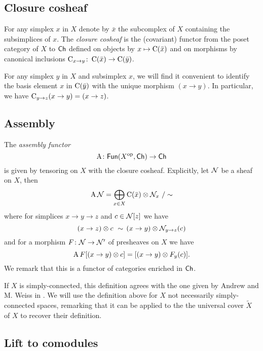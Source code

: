 \subsection{Closure cosheaf}

For any simplex $x$ in $X$ denote by $\bar x$ the subcomplex of $X$ containing the subsimplices of $x$.
The \textit{closure cosheaf} is the (covariant) functor from the poset category of $X$ to $\mathsf{Ch}$ defined on objects by $x \mapsto \operatorname{C}(\bar x)$ and on morphisms by canonical inclusions $\operatorname{C}_{x \to y} \colon \operatorname{C}(\bar x) \to \operatorname{C}(\bar y)$.

For any simplex $y$ in $X$ and subsimplex $x$, we will find it convenient to identify the basis element $x$ in $\operatorname{C}(\bar y)$ with the unique morphism $(x \to y)$.
In particular, we have $\operatorname{C}_{y \to z} (x \to y) = (x \to z)$.

\subsection{Assembly}\label{ss:assembly}

The \textit{assembly functor}
\[
\operatorname{A} \colon \mathsf{Fun}(X^{\mathrm{op}}, \mathsf{Ch}) \to \mathsf{Ch}
\]
is given by tensoring on $X$ with the closure cosheaf.
Explicitly, let $\mathcal{N}$ be a sheaf on $X$, then
\[
\operatorname{A} \mathcal{N} = \bigoplus_{x \in X} \operatorname{C}(\bar x) \otimes \mathcal{N}_x \ / \sim
\]
where for simplices $x \to y \to z$ and $c \in \mathcal{N}[z]$ we have
\[
(x \to z) \otimes c \ \sim \, (x \to y) \otimes \mathcal{N}_{y \to z}(c)
\]
and for a morphism $F \colon \mathcal{N} \to \mathcal{N}'$ of presheaves on $X$ we have
\[
\operatorname{A} F[(x \to y) \otimes c] = [(x \to y) \otimes F_y(c)].
\]
We remark that this is a functor of categories enriched in $\mathsf{Ch}$.

If $X$ is simply-connected, this definition agrees with the one given by Andrew and M. Weiss in \cite[Definition 1.4]{ranicki1990assembly}.
We will use the definition above for $X$ not necessarily simply-connected spaces, remarking that it can be applied to the the universal cover $\widetilde{X}$ of $X$ to recover their definition.

\subsection{Lift to comodules}

